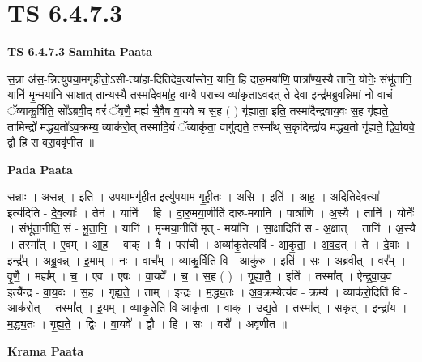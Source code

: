 \documentclass[17pt]{extarticle}
\begin{document}
\section{ TS 6.4.7.3 }

\textbf{TS 6.4.7.3 } \newline
\textbf{Samhita Paata} \newline

स॒न्ना अ॑स॒-न्नित्यु॑पया॒मगृ॑हीतो॒ऽसी-त्या॑हा-दितिदेव॒त्या᳚स्तेन॒ यानि॒ हि दा॑रु॒मया॑णि॒ पात्रा᳚ण्य॒स्यै तानि॒ योनेः॒ संभू॑तानि॒ यानि॑ मृ॒न्मया॑नि सा॒क्षात् तान्य॒स्यै तस्मा॑दे॒वमा॑ह॒ वाग्वै परा॒च्य-व्या॑कृताऽवद॒त् ते दे॒वा इन्द्र॑मब्रुवन्नि॒मां नो॒ वाचं॒ ॅव्याकु॒र्विति॒ सो᳚ऽब्रवी॒द् वरं॑ ॅवृणै॒ मह्यं॑ चै॒वैष वा॒यवे॑ च स॒ह ( ) गृ॑ह्याता॒ इति॒ तस्मा॑दैन्द्रवाय॒वः स॒ह गृ॑ह्यते॒ तामिन्द्रो॑ मद्ध्य॒तो॑ऽव॒क्रम्य॒ व्याक॑रो॒त् तस्मा॑दि॒यं ॅव्याकृ॑ता॒ वागु॑द्यते॒ तस्मा᳚थ् स॒कृदिन्द्रा॑य मद्ध्य॒तो गृ॑ह्यते॒ द्विर्वा॒यवे॒ द्वौ हि स वरा॒ववृ॑णीत ॥ \newline

\textbf{Pada Paata} \newline

स॒न्नाः । अ॒स॒न्न् । इति॑ । उ॒प॒या॒मगृ॑हीत॒ इत्यु॑पया॒म-गृ॒ही॒तः॒ । अ॒सि॒ । इति॑ । आ॒ह॒ । अ॒दि॒ति॒दे॒व॒त्या॑ इत्य॑दिति - दे॒व॒त्याः᳚ । तेन॑ । यानि॑ । हि । दा॒रु॒मया॒णीति॑ दारु-मया॑नि । पात्रा॑णि । अ॒स्यै । तानि॑ । योनेः᳚ । संभू॑ता॒नीति॒ सं - भू॒ता॒नि॒ । यानि॑ । मृ॒न्मया॒नीति॑ मृत् - मया॑नि । सा॒क्षादिति॑ स - अ॒क्षात् । तानि॑ । अ॒स्यै । तस्मा᳚त् । ए॒वम् । आ॒ह॒ । वाक् । वै । परा॑ची । अव्या॑कृ॒तेत्यवि॑ - आ॒कृ॒ता॒ । अ॒व॒द॒त् । ते । दे॒वाः । इन्द्र᳚म् । अ॒ब्रु॒व॒न्न् । इ॒माम् । नः॒ । वाच᳚म् । व्याकु॒र्विति॑ वि - आकु॑रु । इति॑ । सः । अ॒ब्र॒वी॒त् । वर᳚म् । वृ॒णै॒ । मह्य᳚म् । च॒ । ए॒व । ए॒षः । वा॒यवे᳚ । च॒ । स॒ह ( ) । गृ॒ह्या॒तै॒ । इति॑ । तस्मा᳚त् । ऐ॒न्द्र॒वा॒य॒व इत्यै᳚न्द्र - वा॒य॒वः । स॒ह । गृ॒ह्य॒ते॒ । ताम् । इन्द्रः॑ । म॒द्ध्य॒तः । अ॒व॒क्रम्येत्य॑व - क्रम्य॑ । व्याक॑रो॒दिति॑ वि - आक॑रोत् । तस्मा᳚त् । इ॒यम् । व्याकृ॒तेति॑ वि-आकृ॑ता । वाक् । उ॒द्य॒ते॒ । तस्मा᳚त् । स॒कृत् । इन्द्रा॑य । म॒द्ध्य॒तः । गृ॒ह्य॒ते॒ । द्विः । वा॒यवे᳚ । द्वौ । हि । सः । वरौ᳚ । अवृ॑णीत ॥  \newline


\textbf{Krama Paata} \newline
\end{document}

